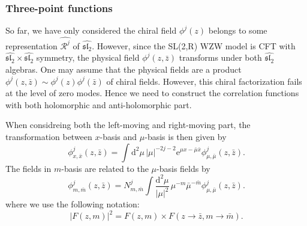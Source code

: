 \documentclass[10pt,a4paper]{article}
\numberwithin{equation}{section}
\begin{document}
\subsubsection*{Three-point functions}
So far, we have only considered the chiral field $\phi^{j}(z)$ belongs to some representation $\widehat{\mathcal{R}^{j}}$ of 
$\widehat{\mathfrak{sl}_{2}}$. However, since the SL(2,R) WZW model is CFT with $\widehat{\mathfrak{sl}_{2}}\times\widehat{\mathfrak{sl}_{2}}$ 
symmetry, the physical field $\phi^{j}(z,\bar{z})$ transforms under both $\widehat{\mathfrak{sl}_{2}}$ algebras. One may assume that 
the physical fields are a product $\phi^{j}(z,\bar{z}) \sim \phi^{j}(z)\phi^{j}(\bar{z})$ of chiral fields. However, this chiral 
factorization fails at the level of zero modes. Hence we need to construct the correlation functions with both holomorphic and anti-holomorphic 
part.

When considreing both the left-moving and right-moving part, the transformation between $x$-basis and $\mu$-basis is then given by 
\begin{equation}
    \phi^{j}_{x,\bar{x}}(z,\bar{z}) = \int \mathrm{d}^{2} \mu \, |\mu|^{-2j-2} \mathrm{e}^{\mu x - \bar{\mu} \bar{x}} \phi^{j}_{\mu,\bar{\mu}}(z,\bar{z}).
\end{equation}
The fields in $m$-basis are related to the $\mu$-basis fields by 
\begin{equation}
    \phi^{j}_{m,\bar{m}}(z,\bar{z}) = N^{j}_{m,\bar{m}} \int \frac{\mathrm{d}^{2} \mu }{|\mu|^{2}} \, \mu^{-m} \bar{\mu}^{-\bar{m}} \phi^{j}_{\mu,\bar{\mu}} (z,\bar{z}).
\end{equation}
where we use the following notation:
\begin{equation}
    \left| F(z,m) \right|^{2} = F(z,m) \times F(z\rightarrow \bar{z}, m \rightarrow \bar{m}).
\end{equation}
\end{document}
